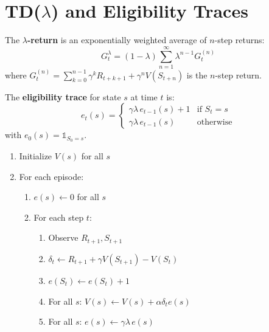 \section{TD($\lambda$) and Eligibility Traces}

\begin{definition}
The \textbf{$\lambda$-return} is an exponentially weighted average of $n$-step
returns:
\[
    G_t^\lambda = (1-\lambda) \sum_{n=1}^{\infty} \lambda^{n-1} G_t^{(n)}
\]
where $G_t^{(n)} = \sum_{k=0}^{n-1} \gamma^k R_{t+k+1} + \gamma^n V(S_{t+n})$
is the $n$-step return.
\end{definition}

\begin{definition}
The \textbf{eligibility trace} for state $s$ at time $t$ is:
\[
    e_t(s) = \begin{cases}
        \gamma \lambda \, e_{t-1}(s) + 1 & \text{if } S_t = s \\
        \gamma \lambda \, e_{t-1}(s) & \text{otherwise}
    \end{cases}
\]
with $e_0(s) = \mathbb{1}_{S_0 = s}$.
\end{definition}

\begin{algorithme}[title=\textbf{TD($\lambda$) with Eligibility Traces}]
\begin{enumerate}
    \item Initialize $V(s)$ for all $s$
    \item For each episode:
    \begin{enumerate}
        \item $e(s) \leftarrow 0$ for all $s$
        \item For each step $t$:
        \begin{enumerate}
            \item Observe $R_{t+1}, S_{t+1}$
            \item $\delta_t \leftarrow R_{t+1} + \gamma V(S_{t+1}) - V(S_t)$
            \item $e(S_t) \leftarrow e(S_t) + 1$
            \item For all $s$: $V(s) \leftarrow V(s) + \alpha \delta_t e(s)$
            \item For all $s$: $e(s) \leftarrow \gamma \lambda \, e(s)$
        \end{enumerate}
    \end{enumerate}
\end{enumerate}
\end{algorithme}

